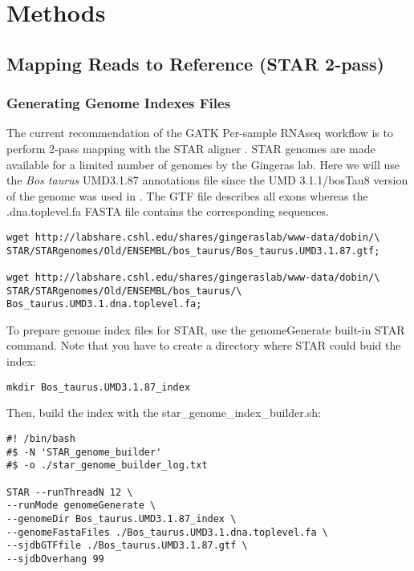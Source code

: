 

\section{Methods}



\subsection{Mapping Reads to Reference (STAR 2-pass)}



\subsubsection{Generating Genome Indexes Files}
The current recommendation of the GATK Per-sample RNAseq  workflow is to perform 2-pass mapping with the STAR aligner \cite{Dobin2013}. STAR genomes are made available for a limited number of genomes by the Gingeras lab. Here we will use the \textit{Bos taurus} UMD3.1.87 annotations file since the UMD 3.1.1/bosTau8 version of the genome was used in \citep{Ariel2021}. The GTF file describes all exons whereas the .dna.toplevel.fa FASTA file contains the corresponding sequences.

\begin{verbatim}
wget http://labshare.cshl.edu/shares/gingeraslab/www-data/dobin/\
STAR/STARgenomes/Old/ENSEMBL/bos_taurus/Bos_taurus.UMD3.1.87.gtf;

wget http://labshare.cshl.edu/shares/gingeraslab/www-data/dobin/\
STAR/STARgenomes/Old/ENSEMBL/bos_taurus/\
Bos_taurus.UMD3.1.dna.toplevel.fa;
\end{verbatim}

To prepare genome index files for STAR, use the genomeGenerate built-in STAR command.
Note that you have to create a directory where STAR could buid the index:

\begin{verbatim}
mkdir Bos_taurus.UMD3.1.87_index
\end{verbatim}

Then, build the index with the star\_genome\_index\_builder.sh:
\begin{verbatim}
#! /bin/bash
#$ -N 'STAR_genome_builder'
#$ -o ./star_genome_builder_log.txt

STAR --runThreadN 12 \
--runMode genomeGenerate \
--genomeDir Bos_taurus.UMD3.1.87_index \
--genomeFastaFiles ./Bos_taurus.UMD3.1.dna.toplevel.fa \
--sjdbGTFfile ./Bos_taurus.UMD3.1.87.gtf \
--sjdbOverhang 99
\end{verbatim}



